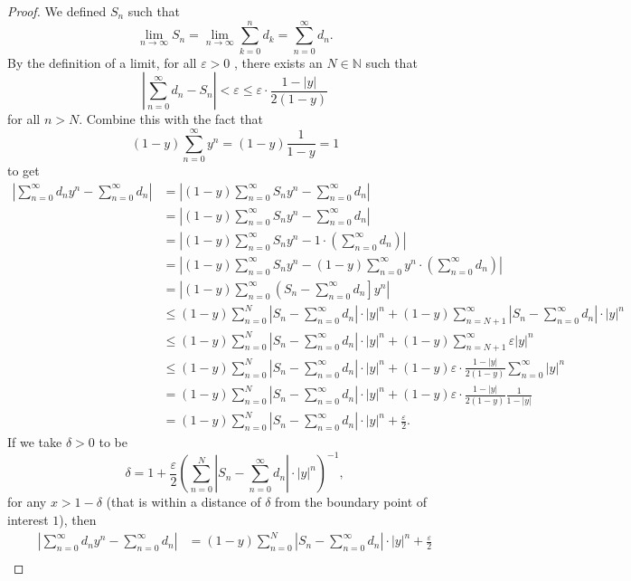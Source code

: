 \documentclass{article}
\newcommand{\N}{\mathbb{N}}
\theoremstyle{definition}
\begin{document}
\begin{proof}
		We defined $S_n$ such that $$ \lim\limits_{n\to\infty}S_n= \lim\limits_{n\to\infty} \sum_{k=0}^{n}d_k = \sum_{n=0}^\infty d_n.$$ By the definition of a limit, for all $ \varepsilon >0$ , there exists an $ N\in\N $ such that $$\left\lvert\sum_{n=0}^\infty d_n-S_n\right\rvert<\varepsilon \le  \varepsilon\cdot\frac{1-|y|}{2(1-y)}$$ for all $ n>N $. Combine this with the fact that  $$(1-y)\sum_{n=0}^\infty y^n = (1-y)\frac{1}{1-y} = 1$$ to get 
		\begin{align*}
			\left\lvert\sum_{n=0}^{\infty}d_ny^n -  \sum_{n=0}^{\infty}d_n\right\rvert & = \left\lvert(1-y)\sum_{n=0}^{\infty}S_ny^n - \sum_{n=0}^{\infty}d_n\right\rvert\\
			&= \left\lvert(1-y)\sum_{n=0}^{\infty}S_ny^n - \sum_{n=0}^{\infty}d_n\right\rvert\\
			&= \left\lvert(1-y)\sum_{n=0}^{\infty}S_ny^n - 1\cdot\left(\sum_{n=0}^{\infty}d_n\right)\right\rvert\\
			&= \left\lvert(1-y)\sum_{n=0}^{\infty}S_ny^n - (1-y)\sum_{n=0}^{\infty}y^n\cdot\left(\sum_{n=0}^{\infty}d_n\right)\right\rvert\\
			&= \left\lvert(1-y)\sum_{n=0}^{\infty}\left(S_n-\sum_{n=0}^{\infty}d_n\right]y^n \right\rvert\\
			& \le (1-y)\sum_{n=0}^{N}\left\lvert S_n-\sum_{n=0}^{\infty}d_n \right\rvert\cdot|y|^n + (1-y)\sum_{n=N+1}^{\infty}\left\lvert S_n-\sum_{n=0}^{\infty}d_n \right\rvert\cdot|y|^n \\ 
			& \le (1-y)\sum_{n=0}^{N}\left\lvert S_n-\sum_{n=0}^{\infty}d_n \right\rvert\cdot|y|^n + (1-y)\sum_{n=N+1}^{\infty}\varepsilon|y|^n \\ & \le (1-y)\sum_{n=0}^{N}\left\lvert S_n-\sum_{n=0}^{\infty}d_n \right\rvert\cdot|y|^n + (1-y)\varepsilon\cdot\frac{1-|y|}{2(1-y)}\sum_{n=0}^{\infty}|y|^n \\ & = (1-y)\sum_{n=0}^{N}\left\lvert S_n-\sum_{n=0}^{\infty}d_n \right\rvert\cdot|y|^n + (1-y)\varepsilon\cdot\frac{1-|y|}{2(1-y)} \frac{1}{1-|y|} \\ & = (1-y)\sum_{n=0}^{N}\left\lvert S_n-\sum_{n=0}^{\infty}d_n \right\rvert\cdot|y|^n + \frac{\varepsilon}{2}.
		\end{align*}
		If we take $ \delta  > 0 $ to be $$ \delta = 1 + \frac{\varepsilon}{2}\left(\sum_{n=0}^{N}\left\lvert S_n-\sum_{n=0}^{\infty}d_n \right\rvert\cdot|y|^n\right)^{-1},$$ for any $ x > 1 - \delta $ (that is within a distance of $ \delta $ from the boundary point of interest $ 1 $), then 
		\begin{align*}
			\left\lvert\sum_{n=0}^{\infty}d_ny^n -  \sum_{n=0}^{\infty}d_n\right\rvert & = (1-y)\sum_{n=0}^{N}\left\lvert S_n-\sum_{n=0}^{\infty}d_n \right\rvert\cdot|y|^n + \frac{\varepsilon}{2} \\

\end{align*}
\end{proof}
\end{document}
